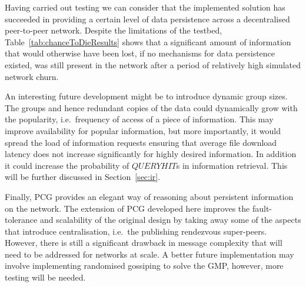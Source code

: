 %
%

Having carried out testing we can consider that the implemented solution has succeeded in providing a certain level of data persistence across a decentralised peer-to-peer network. Despite the limitations of the testbed, Table~\ref{tab:chanceToDieResults} shows that a significant amount of information that would otherwise have been lost, if no mechanisms for data persistence existed, was still present in the network after a period of relatively high simulated network churn.

An interesting future development might be to introduce dynamic group sizes\cite{ramaswamy2005clustering}. The groups and hence redundant copies of the data could dynamically grow with the popularity, i.e.\ frequency of access of a piece of information. This may improve availability for popular information, but more importantly, it would spread the load of information requests ensuring that average file download latency does not increase significantly for highly desired information. In addition it could increase the probability of $QUERYHIT$s in information retrieval. This will be further discussed in Section~\ref{sec:ir}.

Finally, PCG provides an elegant way of reasoning about persistent information on the network. The extension of PCG developed here improves the fault-tolerance and scalability of the original design by taking away some of the aspects that introduce centralisation, i.e.\ the publishing rendezvous super-peers. However, there is still a significant drawback in message complexity that will need to be addressed for networks at scale. A better future implementation may involve implementing randomised gossiping to solve the GMP, however, more testing will be needed.



